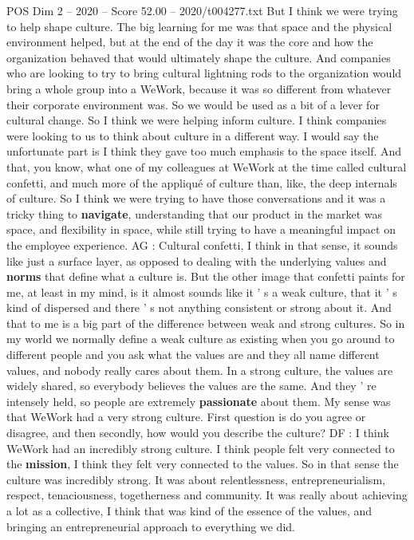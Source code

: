 \begin{textsample}{POS Dim 2 – 2020 – Score 52.00 – 2020/t004277.txt}
But I think we were trying to help shape culture.
The big learning for me was that space and the physical environment helped, but at the end of the day it was the core and how the organization behaved that would ultimately shape the culture.
And companies who are looking to try to bring cultural lightning rods to the organization would bring a whole group into a WeWork, because it was so different from whatever their corporate environment was.
So we would be used as a bit of a lever for cultural change.
So I think we were helping inform culture.
I think companies were looking to us to think about culture in a different way.
I would say the unfortunate part is I think they gave too much emphasis to the space itself.
And that, you know, what one of my colleagues at WeWork at the time called cultural confetti, and much more of the appliqué of culture than, like, the deep internals of culture.
So I think we were trying to have those conversations and it was a tricky thing to \textbf{navigate}, understanding that our product in the market was space, and flexibility in space, while still trying to have a meaningful impact on the employee experience.
AG : Cultural confetti, I think in that sense, it sounds like just a surface layer, as opposed to dealing with the underlying values and \textbf{norms} that define what a culture is.
But the other image that confetti paints for me, at least in my mind, is it almost sounds like it ' s a weak culture, that it ' s kind of dispersed and there ' s not anything consistent or strong about it.
And that to me is a big part of the difference between weak and strong cultures.
So in my world we normally define a weak culture as existing when you go around to different people and you ask what the values are and they all name different values, and nobody really cares about them.
In a strong culture, the values are widely shared, so everybody believes the values are the same.
And they ' re intensely held, so people are extremely \textbf{passionate} about them.
My sense was that WeWork had a very strong culture.
First question is do you agree or disagree, and then secondly, how would you describe the culture?
DF : I think WeWork had an incredibly strong culture.
I think people felt very connected to the \textbf{mission}, I think they felt very connected to the values.
So in that sense the culture was incredibly strong.
It was about relentlessness, entrepreneurialism, respect, tenaciousness, togetherness and community.
It was really about achieving a lot as a collective, I think that was kind of the essence of the values, and bringing an entrepreneurial approach to everything we did.

\end{textsample}
